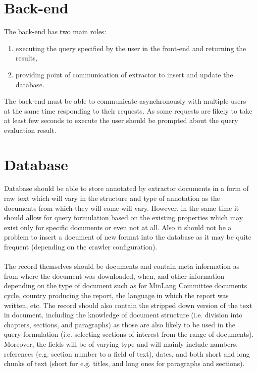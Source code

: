 \documentclass{tufte-book}
\begin{document}
\section{Back-end}
The back-end has two main roles:
\begin{enumerate}
  \item executing the query specified by the user in the front-end and returning the results,
  \item providing point of communication of extractor to insert and update the database.
\end{enumerate}
The back-end must be able to communicate asynchronously with multiple users at the same time responding to their requests. As some requests are likely to take at least few seconds to execute the user should be prompted about the query evaluation result.

\section{Database}
\paragraph{}
Database should be able to store annotated by extractor documents in a form of raw text which will vary in the structure and type of annotation as the documents from which they will come will vary. However, in the same time it should allow for query formulation based on the existing properties which may exist only for specific documents or even not at all. Also it should not be a problem to insert a document of new format into the database as it may be quite frequent (depending on the crawler configuration).

\paragraph{}
The record themselves should be documents and contain meta information as from where the document was downloaded, when, and other information depending on the type of document such as for MinLang Committee documents cycle, country producing the report, the language in which the report was written, etc. The record should also contain the stripped down version of the text in document, including the knowledge of document structure (i.e. division into chapters, sections, and paragraphs) as those are also likely to be used in the query formulation (i.e. selecting sections of interest from the range of documents). Moreover, the fields will be of varying type and will mainly include numbers, references (e.g. section number to a field of text), dates, and both short and long chunks of text (short for e.g. titles, and long ones for paragraphs and sections).
\end{document}
